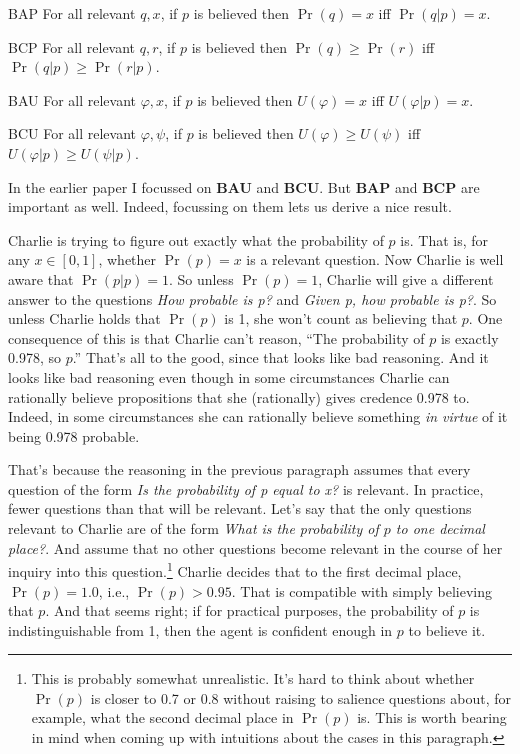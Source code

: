 \documentclass[11pt,oneside]{book}
\begin{document}
\begin{description*}
\item[BAP] For all relevant $q, x$, if $p$ is believed then $\Pr(q) = x$ iff $\Pr(q | p) = x$.
\item[BCP] For all relevant $q, r$, if $p$ is believed then $\Pr(q) \geq \Pr(r)$ iff $\Pr(q | p) \geq \Pr(r | p)$.
\item[BAU] For all relevant $\varphi, x$, if $p$ is believed then $U(\varphi) = x$ iff $U(\varphi | p) = x$.
\item[BCU] For all relevant $\varphi, \psi$, if $p$ is believed then $U(\varphi) \geq U(\psi)$ iff $U(\varphi | p) \geq U(\psi | p)$.
\end{description*}

\noindent In the earlier paper I focussed on \textbf{BAU} and \textbf{BCU}. But \textbf{BAP} and \textbf{BCP} are important as well. Indeed, focussing on them lets us derive a nice result. 

Charlie is trying to figure out exactly what the probability of $p$ is. That is, for any $x \in [0, 1]$, whether $\Pr(p) = x$ is a relevant question. Now Charlie is well aware that $\Pr(p | p) = 1$. So unless $\Pr(p) = 1$, Charlie will give a different answer to the questions \textit{How probable is p?} and \textit{Given p, how probable is p?}. So unless Charlie holds that $\Pr(p)$ is 1, she won't count as believing that $p$. One consequence of this is that Charlie can't reason, ``The probability of $p$ is exactly 0.978, so $p$.'' That's all to the good, since that looks like bad reasoning. And it looks like bad reasoning even though in some circumstances Charlie can rationally believe propositions that she (rationally) gives credence 0.978 to. Indeed, in some circumstances she can rationally believe something \textit{in virtue} of it being 0.978 probable.

That's because the reasoning in the previous paragraph assumes that every question of the form \textit{Is the probability of p equal to x?} is relevant. In practice, fewer questions than that will be relevant. Let's say that the only questions relevant to Charlie are of the form \textit{What is the probability of $p$ to one decimal place?}. And assume that no other questions become relevant in the course of her inquiry into this question.\footnote{This is probably somewhat unrealistic. It's hard to think about whether $\Pr(p)$ is closer to 0.7 or 0.8 without raising to salience questions about, for example, what the second decimal place in $\Pr(p)$ is. This is worth bearing in mind when coming up with intuitions about the cases in this paragraph.} Charlie decides that to the first decimal place, $\Pr(p) = 1.0$, i.e., $\Pr(p) > 0.95$. That is compatible with simply believing that $p$. And that seems right; if for practical purposes, the probability of $p$ is indistinguishable from 1, then the agent is confident enough in $p$ to believe it.
\end{document}
